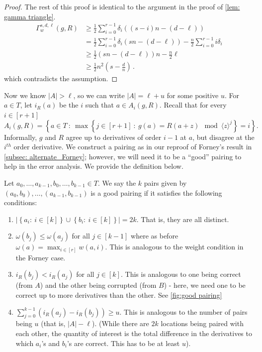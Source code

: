 \documentclass{article}
\def\set#1{\left\{ #1 \right\}}
\def\abs#1{\left| #1 \right|}
\def\inbrace#1{\left\{ #1 \right\}}
\def\setdef#1#2{\inbrace{ #1 \ \colon \ #2}}      %
\begin{document}
\begin{proof}
		The rest of this proof is identical to the argument in the proof of \cref{lem: gamma triangle}. 
		\[  
		\begin{split}
			\Gamma_w^{s,d,\ell}(g, R) & \geq \frac{1}{2} \sum_{i=0}^{r-1} \delta_i ((s-i)n - (d-\ell))  \\
			& = \frac{1}{2} \sum_{i=0}^{r-1} \delta_i (sn - (d-\ell)) -\frac{n}{2} \sum_{i=0}^{r-1} i \delta_i   \\
			& \geq \frac{1}{2} (sn-(d-\ell))n -  \frac{n}{2}\ell \\
			& \geq \frac{1}{2} n^2  \left(s- \frac{d}{n} \right) \, .
		\end{split}
		\]
		which contradicts the assumption.
	\end{proof}
	
	Now we know $\abs{A} > \ell$, so we can write $\abs{A} = \ell+u$ for some positive $u$.
	For $a \in T$, let $i_R(a)$ be the $i$ such that $a \in A_i(g, R)$. Recall that for every $i \in [r+1]$
	\[
	A_i(g,R)=\setdef{a\in T}{\max{\setdef{j\in [r+1]}{g(a)=R(a+z) \mod \langle z\rangle^{j}}}=i}.
	\]
	Informally, $g$ and $R$ agree up to derivatives of order $i-1$ at $a$, but disagree at the $i^{th}$ order derivative.
	We construct a pairing as in our reproof of Forney's result in \cref{subsec: alternate_Forney}; however,  we will need it to be a ``good'' pairing to help in the error analysis. We provide the definition below.
	
	\begin{definition} \label{def: good pairing}
		Let $a_0, \dotsc, a_{k-1}, b_0, \dotsc, b_{k-1} \in T$. We say the $k$ pairs given by $(a_0,
		b_0), \dotsc, (a_{k-1}, b_{k-1})$ is a good pairing if it satisfies
		the following conditions: 
		
		
		\begin{enumerate}
			\item $\abs{\set{a_i\colon \ i \in [k]}\cup \set{b_i\colon \ i \in [k]}} = 2k$. That is, they are all distinct. 
			\item $\omega(b_j) \leq \omega(a_j)$ for all $j \in [k-1]$  where as before  $ \omega(a) = \max_{i \in [r]} w(a, i)$.
			This is analogous to the weight condition in the Forney case.
			\item $i_R(b_j) < i_R(a_j)$ for all $j \in [k]$. This is analogous to one being correct (from $A$) and the other being corrupted (from $B$) - here, we need one to be correct up to more derivatives than the other. See \cref{fig:good pairing}
			\item $\sum_{j=0}^{k-1} (i_R(a_j) - i_R(b_j)) \geq u$. This is
			analogous to the number of pairs being $u$ (that is,  $\abs{A} -
			\ell$). (While there are $2k$ locations being paired with each
			other, the quantity of interest is the total difference in the
			derivatives to which $a_i$'s and $b_i$'s are correct. This has
			to be at least $u$). \qedhere
		\end{enumerate}
	\end{definition}
	
\end{document}

